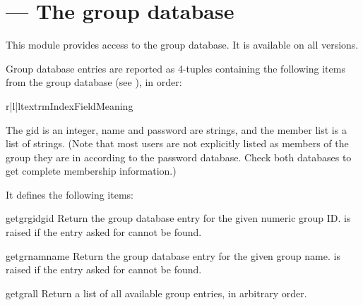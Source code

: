 \section{ ---
         The group database}



This module provides access to the \UNIX{} group database.
It is available on all \UNIX{} versions.

Group database entries are reported as 4-tuples containing the
following items from the group database (see ), in order:

\begin{tableiii}{r|l|l}{textrm}{Index}{Field}{Meaning}
\end{tableiii}

The gid is an integer, name and password are strings, and the member
list is a list of strings.
(Note that most users are not explicitly listed as members of the
group they are in according to the password database.  Check both
databases to get complete membership information.)

It defines the following items:

\begin{funcdesc}{getgrgid}{gid}
Return the group database entry for the given numeric group ID.
 is raised if the entry asked for cannot be found.
\end{funcdesc}

\begin{funcdesc}{getgrnam}{name}
Return the group database entry for the given group name.
 is raised if the entry asked for cannot be found.
\end{funcdesc}

\begin{funcdesc}{getgrall}{}
Return a list of all available group entries, in arbitrary order.
\end{funcdesc}


\begin{seealso}
\end{seealso}
